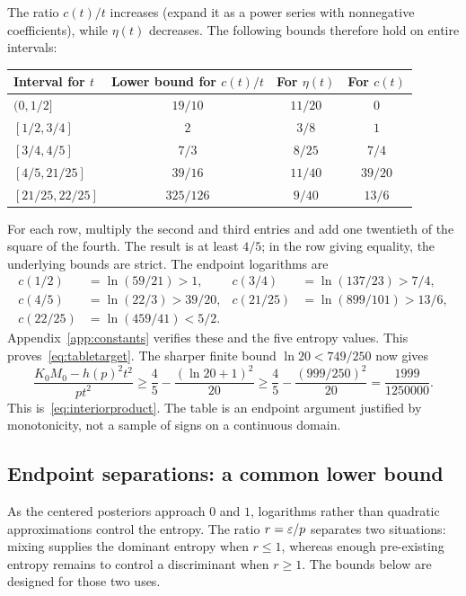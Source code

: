 The ratio $c(t)/t$ increases (expand it as a power series with nonnegative coefficients), while $\eta(t)$ decreases. The following bounds therefore hold on entire intervals:
\begin{center}
\renewcommand{\arraystretch}{1.18}
\begin{tabular}{@{}lccc@{}}
\toprule
Interval for $t$ & Lower bound for $c(t)/t$ & For $\eta(t)$ & For $c(t)$\\
\midrule
$(0,1/2]$ & $19/10$ & $11/20$ & $0$\\
$[1/2,3/4]$ & $2$ & $3/8$ & $1$\\
$[3/4,4/5]$ & $7/3$ & $8/25$ & $7/4$\\
$[4/5,21/25]$ & $39/16$ & $11/40$ & $39/20$\\
$[21/25,22/25]$ & $325/126$ & $9/40$ & $13/6$\\
\bottomrule
\end{tabular}
\end{center}
For each row, multiply the second and third entries and add one twentieth of the square of the fourth. The result is at least $4/5$; in the row giving equality, the underlying bounds are strict. The endpoint logarithms are
\begin{align*}
c(1/2)&=\ln(59/21)>1, & c(3/4)&=\ln(137/23)>7/4,\\
c(4/5)&=\ln(22/3)>39/20, & c(21/25)&=\ln(899/101)>13/6,\\
c(22/25)&=\ln(459/41)<5/2.
\end{align*}
Appendix~\ref{app:constants} verifies these and the five entropy values. This proves~\eqref{eq:tabletarget}. The sharper finite bound $\ln20<749/250$ now gives
\[
\frac{K_0M_0-h(p)^2t^2}{pt^2}
\ge\frac45-\frac{(\ln20+1)^2}{20}
\ge\frac45-\frac{(999/250)^2}{20}
=\frac{1999}{1250000}.
\]
This is~\eqref{eq:interiorproduct}. The table is an endpoint argument justified by monotonicity, not a sample of signs on a continuous domain.

\subsection{Endpoint separations: a common lower bound}\label{app:endpoint}
As the centered posteriors approach $0$ and $1$, logarithms rather than quadratic approximations control the entropy. The ratio $r=\varepsilon/p$ separates two situations: mixing supplies the dominant entropy when $r\le1$, whereas enough pre-existing entropy remains to control a discriminant when $r\ge1$. The bounds below are designed for those two uses.

